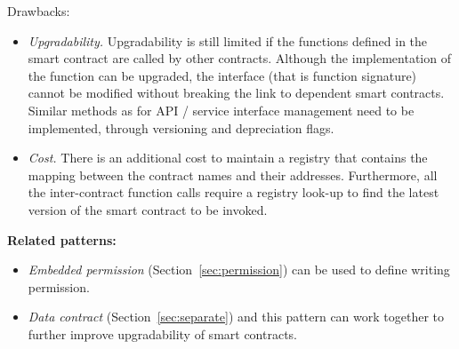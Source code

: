 Drawbacks: 
\begin{itemize}
  \item \textit{Upgradability.} Upgradability is still limited if the functions defined in the smart contract are called by other contracts. Although the implementation of the function can be upgraded, the interface (that is function signature) cannot be modified without breaking the link to dependent smart contracts. Similar methods as for API / service interface management need to be implemented, \eg through versioning and depreciation flags.
  \item \textit{Cost.} There is an additional cost to maintain a registry that contains the mapping between the contract names and their addresses. Furthermore, all the inter-contract function calls require a registry look-up to find the latest version of the smart contract to be invoked.
\end{itemize}


\vspace{0.5em}\noindent \textbf{Related patterns:}
\begin{itemize}
    \item \textit{Embedded permission} (Section~\ref{sec:permission}) can be used to define writing permission. %
    \item \textit{Data contract} (Section~\ref{sec:separate}) and this pattern can work together to further improve upgradability of smart contracts. 
\end{itemize}


